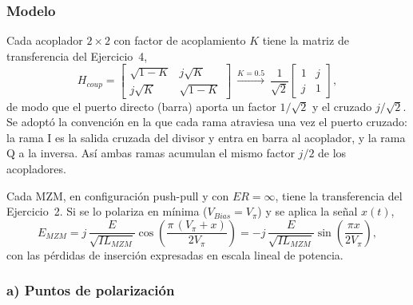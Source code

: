 \subsubsection*{Modelo}

Cada acoplador $2\times2$ con factor de acoplamiento $K$ tiene la matriz de
transferencia del Ejercicio~4,
%
\begin{equation}
H_{coup} = \begin{bmatrix} \sqrt{1-K} & j\sqrt{K} \\ j\sqrt{K} & \sqrt{1-K} \end{bmatrix}
\ \xrightarrow{K = 0.5}\
\frac{1}{\sqrt{2}}\begin{bmatrix} 1 & j \\ j & 1 \end{bmatrix},
\end{equation}
%
de modo que el puerto directo (barra) aporta un factor $1/\sqrt{2}$ y el
cruzado $j/\sqrt{2}$. Se adoptó la convención en la que cada rama atraviesa
una vez el puerto cruzado: la rama I es la salida cruzada del divisor y
entra en barra al acoplador, y la rama Q a la inversa. Así ambas ramas
acumulan el mismo factor $j/2$ de los acopladores.

Cada MZM, en configuración push-pull y con $ER = \infty$, tiene la
transferencia del Ejercicio~2. Si se lo polariza en mínima
($V_{Bias} = V_\pi$) y se aplica la señal $x(t)$,
%
\begin{equation}
E_{MZM} = j\,\frac{E}{\sqrt{IL_{MZM}}}\cos\!\left(\frac{\pi\,(V_\pi + x)}{2V_\pi}\right)
= -j\,\frac{E}{\sqrt{IL_{MZM}}}\sin\!\left(\frac{\pi x}{2V_\pi}\right),
\end{equation}
%
con las pérdidas de inserción expresadas en escala lineal de potencia.

\subsubsection*{a) Puntos de polarización}

